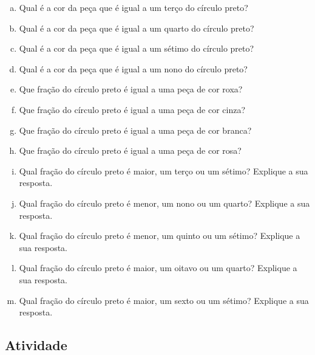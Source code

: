\pagebreak
\begin{enumerate}[a)]
   \item  Qual é a cor da peça que é igual a um terço do círculo preto?
  \item  Qual é a cor da peça que é igual a um quarto do círculo preto?
  \item  Qual é  a cor da peça que é igual a um sétimo do círculo preto?
  \item  Qual é a cor da peça que é igual a um nono do círculo preto?
  \item  Que fração do círculo preto é igual a uma peça de cor roxa?
  \item  Que fração do círculo preto é igual a uma peça de cor cinza?
  \item  Que fração do círculo preto é igual a uma peça de cor branca?
  \item  Que fração do círculo preto é igual a uma peça de cor rosa?
  \item  Qual fração do círculo preto é maior, um terço ou um sétimo? Explique a sua resposta.
  \item  Qual fração do círculo preto é menor, um nono ou um quarto? Explique a sua resposta.
  \item  Qual fração do círculo preto é menor, um quinto ou um sétimo? Explique a sua resposta.
  \item  Qual fração do círculo preto é maior, um oitavo ou um quarto? Explique a sua resposta.
  \item  Qual fração do círculo preto é maior, um sexto ou um sétimo? Explique a sua resposta.
\end{enumerate}

\subsection{Atividade}


